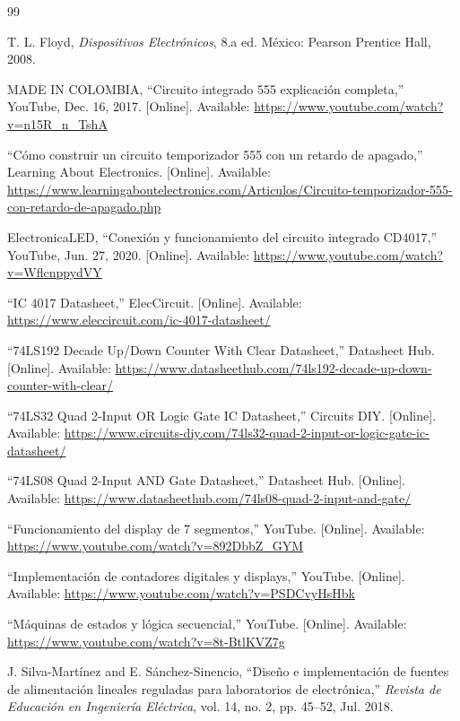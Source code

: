 \documentclass[12pt, journal, onecolumn]{IEEEtran}
\begin{document}
\begin{thebibliography}{99}

T. L. Floyd, \textit{Dispositivos Electrónicos}, 8.a ed. México: Pearson Prentice Hall, 2008.

MADE IN COLOMBIA, ``Circuito integrado 555 explicación completa,'' YouTube, Dec. 16, 2017. [Online]. Available: \url{https://www.youtube.com/watch?v=n15R_n_TshA}

``Cómo construir un circuito temporizador 555 con un retardo de apagado,'' Learning About Electronics. [Online]. Available: \url{https://www.learningaboutelectronics.com/Articulos/Circuito-temporizador-555-con-retardo-de-apagado.php}

ElectronicaLED, ``Conexión y funcionamiento del circuito integrado CD4017,'' YouTube, Jun. 27, 2020. [Online]. Available: \url{https://www.youtube.com/watch?v=WflcnppydVY}

``IC 4017 Datasheet,'' ElecCircuit. [Online]. Available: \url{https://www.eleccircuit.com/ic-4017-datasheet/}

``74LS192 Decade Up/Down Counter With Clear Datasheet,'' Datasheet Hub. [Online]. Available: \url{https://www.datasheethub.com/74ls192-decade-up-down-counter-with-clear/}

``74LS32 Quad 2-Input OR Logic Gate IC Datasheet,'' Circuits DIY. [Online]. Available: \url{https://www.circuits-diy.com/74ls32-quad-2-input-or-logic-gate-ic-datasheet/}

``74LS08 Quad 2-Input AND Gate Datasheet,'' Datasheet Hub. [Online]. Available: \url{https://www.datasheethub.com/74ls08-quad-2-input-and-gate/}

``Funcionamiento del display de 7 segmentos,'' YouTube. [Online]. Available: \url{https://www.youtube.com/watch?v=892DbbZ_GYM}

``Implementación de contadores digitales y displays,'' YouTube. [Online]. Available: \url{https://www.youtube.com/watch?v=PSDCvyHsHbk}

``Máquinas de estados y lógica secuencial,'' YouTube. [Online]. Available: \url{https://www.youtube.com/watch?v=8t-BtlKVZ7g}

J. Silva-Martínez and E. Sánchez-Sinencio, ``Diseño e implementación de fuentes de alimentación lineales reguladas para laboratorios de electrónica,'' \textit{Revista de Educación en Ingeniería Eléctrica}, vol. 14, no. 2, pp. 45--52, Jul. 2018.


\end{thebibliography}
\end{document}
